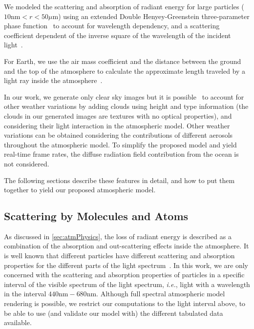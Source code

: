 \documentclass[journal]{vgtc}                %
\newcommand{\review}[1]{{\color{blue}#1}}
\begin{document}
We modeled the scattering and absorption of radiant energy for large particles ($10\text{nm} < r < 50\mu \text{m}$) using an extended Double Henyey-Greenstein three-parameter phase function~\cite{Kattawar:1975} to account for wavelength dependency, and a scattering coefficient dependent of the inverse \review{square} of the wavelength of the incident light~\cite{Hulst:1981}.

For Earth, we use the air mass coefficient and the distance between the ground and the top of the atmosphere to calculate the \review{approximate} length traveled by a light ray inside the atmosphere~\cite{Pickering:2002}.

In our work, we generate only clear sky images but it is possible~\cite{Schneider:2015} to account for other weather variations \review{by} adding clouds using height and type information (the clouds in our generated images are textures with no optical properties), and considering their light interaction in the atmospheric model. Other weather variations can be obtained considering \review{the contributions of different aerosols} throughout the atmospheric model. 
To simplify the proposed model and yield real-time frame rates, the diffuse radiation field contribution from the ocean is not considered.

The following sections describe these features in detail, and how to put them together to \review{yield} our proposed atmospheric model.  

\subsection{Scattering by Molecules and Atoms}

As discussed in \autoref{sec:atmPhysics}, the loss of radiant energy is described as a combination of the absorption and out-scattering effects inside the atmosphere. It is well known that different particles have different scattering and absorption properties for the different parts of the light spectrum~\cite{Chandrasekhar:1960, Hulst:1981, Bohren:1983, Thomas:2017, Keller:2013}. In this work, we are only concerned with the scattering and absorption properties of particles in \review{a} specific interval of the visible spectrum of the light spectrum, \textit{i.e.}, light with a wavelength in the interval $440\text{nm}-680\text{nm}$. Although full spectral atmospheric model rendering is possible, we restrict our computations to the light interval above, to be able to use (and validate our model with) the different tabulated data available.\\
\end{document}
